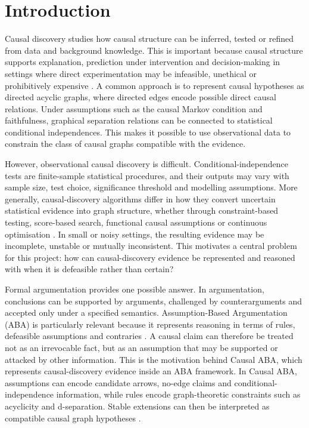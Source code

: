 \chapter{Introduction}
\label{ch:introduction}

Causal discovery studies how causal structure can be inferred, tested or refined from data and background knowledge. This is important because causal structure supports explanation, prediction under intervention and decision-making in settings where direct experimentation may be infeasible, unethical or prohibitively expensive \cite{glymour2019review,vowels2022d}. A common approach is to represent causal hypotheses as directed acyclic graphs, where directed edges encode possible direct causal relations. Under assumptions such as the causal Markov condition and faithfulness, graphical separation relations can be connected to statistical conditional independences. This makes it possible to use observational data to constrain the class of causal graphs compatible with the evidence.

However, observational causal discovery is difficult. Conditional-independence tests are finite-sample statistical procedures, and their outputs may vary with sample size, test choice, significance threshold and modelling assumptions. More generally, causal-discovery algorithms differ in how they convert uncertain statistical evidence into graph structure, whether through constraint-based testing, score-based search, functional causal assumptions or continuous optimisation \cite{glymour2019review}. In small or noisy settings, the resulting evidence may be incomplete, unstable or mutually inconsistent. This motivates a central problem for this project: how can causal-discovery evidence be represented and reasoned with when it is defeasible rather than certain?

Formal argumentation provides one possible answer. In argumentation, conclusions can be supported by arguments, challenged by counterarguments and accepted only under a specified semantics. Assumption-Based Argumentation (ABA) is particularly relevant because it represents reasoning in terms of rules, defeasible assumptions and contraries \cite{bondarenko1997abstract,toni2014tutorial}. A causal claim can therefore be treated not as an irrevocable fact, but as an assumption that may be supported or attacked by other information. This is the motivation behind Causal ABA, which represents causal-discovery evidence inside an ABA framework. In Causal ABA, assumptions can encode candidate arrows, no-edge claims and conditional-independence information, while rules encode graph-theoretic constraints such as acyclicity and d-separation. Stable extensions can then be interpreted as compatible causal graph hypotheses \cite{russo2024argumentative}.

